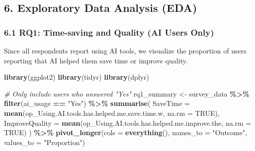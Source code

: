 \documentclass[
]{article}
\newenvironment{Shaded}{\begin{snugshade}}{\end{snugshade}}
\newcommand{\AttributeTok}[1]{\textcolor[rgb]{0.13,0.29,0.53}{#1}}
\newcommand{\CommentTok}[1]{\textcolor[rgb]{0.56,0.35,0.01}{\textit{#1}}}
\newcommand{\ConstantTok}[1]{\textcolor[rgb]{0.56,0.35,0.01}{#1}}
\newcommand{\FunctionTok}[1]{\textcolor[rgb]{0.13,0.29,0.53}{\textbf{#1}}}
\newcommand{\NormalTok}[1]{#1}
\newcommand{\OtherTok}[1]{\textcolor[rgb]{0.56,0.35,0.01}{#1}}
\newcommand{\SpecialCharTok}[1]{\textcolor[rgb]{0.81,0.36,0.00}{\textbf{#1}}}
\newcommand{\StringTok}[1]{\textcolor[rgb]{0.31,0.60,0.02}{#1}}
\begin{document}
\subsection{6. Exploratory Data Analysis
(EDA)}\label{exploratory-data-analysis-eda}

\subsubsection{6.1 RQ1: Time-saving and Quality (AI Users
Only)}\label{rq1-time-saving-and-quality-ai-users-only}

Since all respondents report using AI tools, we visualize the proportion
of users reporting that AI helped them save time or improve quality.

\begin{Shaded}
\begin{Highlighting}[]
\FunctionTok{library}\NormalTok{(ggplot2)}
\FunctionTok{library}\NormalTok{(tidyr)}
\FunctionTok{library}\NormalTok{(dplyr)}

\CommentTok{\# Only include users who answered "Yes"}
\NormalTok{rq1\_summary }\OtherTok{\textless{}{-}}\NormalTok{ survey\_data }\SpecialCharTok{\%\textgreater{}\%}
  \FunctionTok{filter}\NormalTok{(ai\_usage }\SpecialCharTok{==} \StringTok{"Yes"}\NormalTok{) }\SpecialCharTok{\%\textgreater{}\%}
  \FunctionTok{summarise}\NormalTok{(}
    \AttributeTok{SaveTime =} \FunctionTok{mean}\NormalTok{(op\_Using.AI.tools.has.helped.me.save.time.w, }\AttributeTok{na.rm =} \ConstantTok{TRUE}\NormalTok{),}
    \AttributeTok{ImproveQuality =} \FunctionTok{mean}\NormalTok{(op\_Using.AI.tools.has.helped.me.improve.the, }\AttributeTok{na.rm =} \ConstantTok{TRUE}\NormalTok{)}
\NormalTok{  ) }\SpecialCharTok{\%\textgreater{}\%}
  \FunctionTok{pivot\_longer}\NormalTok{(}\AttributeTok{cols =} \FunctionTok{everything}\NormalTok{(), }\AttributeTok{names\_to =} \StringTok{"Outcome"}\NormalTok{, }\AttributeTok{values\_to =} \StringTok{"Proportion"}\NormalTok{)}


\end{Highlighting}
\end{Shaded}
\end{document}
